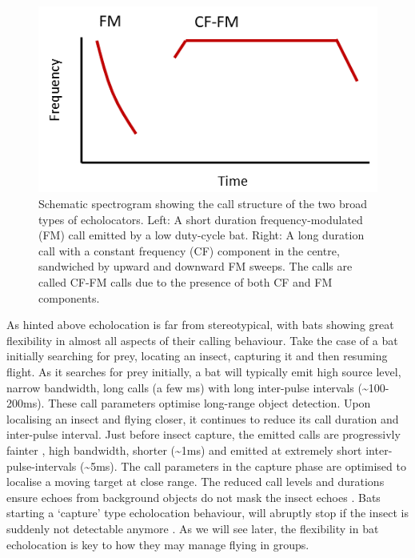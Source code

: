 \documentclass[
]{book}
\begin{document}
\begin{figure}
\includegraphics[width=6.61in]{fmcffm-schematic} \caption{\label{fig:cffmschem}Schematic spectrogram showing the call structure of the two broad types of echolocators. Left: A short duration frequency-modulated (FM) call emitted by a low duty-cycle bat. Right: A long duration call with a constant frequency (CF) component in the centre, sandwiched by upward and downward FM sweeps. The calls are called CF-FM calls due to the presence of both CF and FM components.}\label{fig:cffmschem}
\end{figure}

As hinted above echolocation is far from stereotypical, with bats showing great flexibility in almost all aspects of their calling behaviour. Take the case of a bat initially searching for prey, locating an insect, capturing it and then resuming flight. As it searches for prey initially, a bat will typically emit high source level, narrow bandwidth, long calls (a few ms) with long inter-pulse intervals (\textasciitilde100-200ms). These call parameters optimise long-range object detection. Upon localising an insect and flying closer, it continues to reduce its call duration and inter-pulse interval. Just before insect capture, the emitted calls are progressivly fainter , high bandwidth, shorter (\textasciitilde1ms) and emitted at extremely short inter-pulse-intervals (\textasciitilde5ms). The call parameters in the capture phase are optimised to localise a moving target at close range. The reduced call levels and durations ensure echoes from background objects do not mask the insect echoes \citep{Fenton2014}. Bats starting a `capture' type echolocation behaviour, will abruptly stop if the insect is suddenly not detectable anymore \citep{ubernickel2013flexible, geberl2015fast}. As we will see later, the flexibility in bat echolocation is key to how they may manage flying in groups.
\end{document}
